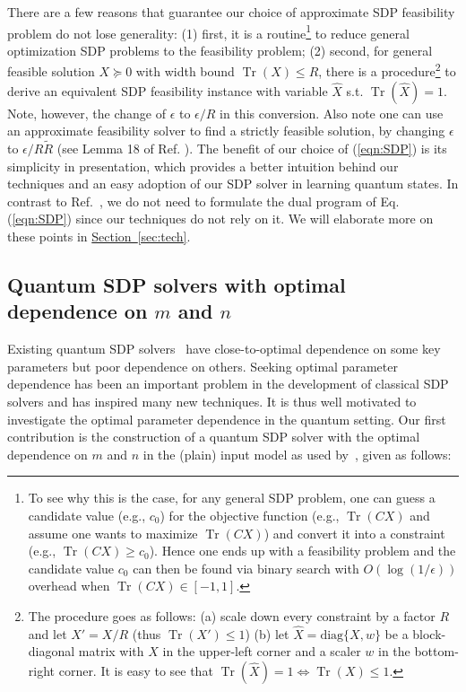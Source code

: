 \documentclass[a4paper,UKenglish,cleveref, autoref]{lipics-v2019}
\theoremstyle{remark}
\numberwithin{equation}{section}
\numberwithin{oracle}{section}
\numberwithin{remark}{section}
\renewcommand{\sec}[1]{\hyperref[sec:#1]{Section~\ref*{sec:#1}}}
\newcommand{\eps}{\varepsilon}
\DeclareMathOperator{\tr}{Tr}
\def \eps {\epsilon}
\begin{document}
There are a few reasons that guarantee our choice of approximate SDP feasibility problem do not lose generality: (1) first, it is a routine\footnote{To see why this is the case, for any general SDP problem, one can guess a candidate value (e.g., $c_0$) for the objective function (e.g., $\tr(CX)$ and assume one wants to maximize $\tr(CX)$) and convert it into a constraint (e.g., $\tr(CX)\geq c_0$). Hence one ends up with a feasibility problem and the candidate value $c_0$ can then be found via binary search with $O(\log(1/\eps))$ overhead when $\tr(CX) \in [-1, 1]$.} to reduce general optimization SDP problems to the feasibility problem; (2) second, for general feasible solution $X\succeq 0$ with width bound $\tr(X)\leq R$, there is a procedure\footnote{The procedure goes as follows: (a) scale down every constraint by a factor $R$ and let $X'=X/R$ (thus $\tr(X')\leq 1$)
(b) let $\hat{X}=\textrm{diag}\{X, w\}$ be a block-diagonal matrix with $X$ in the upper-left corner and a scaler $w$ in the bottom-right corner. It is easy to see that $\tr(\hat{X})=1 \iff \tr(X)\leq 1$.} to derive an equivalent SDP feasibility instance with variable $\hat{X}$ s.t. $\tr(\hat{X})=1$.  Note, however, the change of $\eps$ to $\eps/R$ in this conversion. Also note one can use an approximate feasibility solver to find a strictly feasible solution, by changing $\eps$ to $\eps / R \tilde{R}$ (see Lemma 18 of Ref. \cite{brandao2016quantum}). The benefit of our choice of (\ref{eqn:SDP}) is its simplicity in presentation, which provides a better intuition behind our techniques and an easy adoption of our SDP solver in learning quantum states.
In contrast to Ref.~\cite{vanApeldoorn2017quantum}, we do not need to formulate the dual program of Eq. (\ref{eqn:SDP}) since our techniques do not rely on it.
We will elaborate more on these points in \sec{tech}.

\subsection{Quantum SDP solvers with optimal dependence on $m$ and $n$}
Existing quantum SDP solvers~\cite{brandao2016quantum,vanApeldoorn2017quantum} have close-to-optimal dependence on some key parameters but poor dependence on others. Seeking optimal parameter dependence has been an important problem in the development of classical SDP solvers and has inspired many new techniques. It is thus well motivated to investigate the optimal parameter dependence in the quantum setting.
Our first contribution is the construction of a quantum SDP solver with the optimal dependence on $m$ and $n$ in the (plain) input model as used by~\cite{brandao2016quantum, vanApeldoorn2017quantum}, given as follows:
\end{document}
